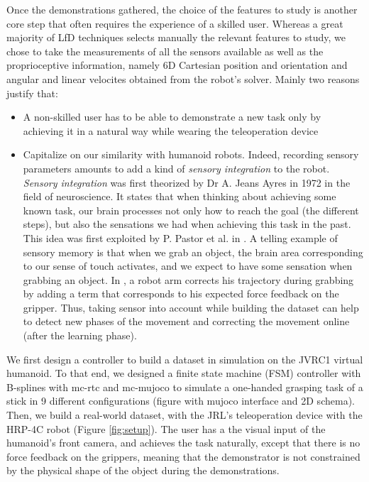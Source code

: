 \documentclass[conference]{IEEEtran}
\begin{document}
Once the demonstrations gathered, the choice of the features to study is another core step that often requires the experience of a skilled user. Whereas a great majority of LfD techniques selects manually the relevant features to study, we chose to take the measurements of all the sensors available as well as the proprioceptive information, namely 6D Cartesian position and orientation and angular and linear velocites obtained from the robot's solver. Mainly two reasons justify that:

 \begin{itemize}
     \item A non-skilled user has to be able to demonstrate a new task only by achieving it in a  natural way while wearing the teleoperation device
     \item Capitalize on our similarity with humanoid robots. Indeed, recording sensory parameters amounts to add a kind of \textit{sensory integration} to the robot. \textit{Sensory integration} was first theorized by Dr A. Jeans Ayres in 1972 in the field of neuroscience. It states that when thinking about achieving some known task, our brain processes not only how to reach the goal (the different steps), but also the sensations we had when achieving this task in the past. This idea was first exploited by P. Pastor et al. in \cite{sensory_skill}. A telling example of sensory memory is that when we grab an object, the brain area corresponding to our sense of touch activates, and we expect to have some sensation when grabbing an object. In \cite{sensory_skill}, a robot arm corrects his trajectory during grabbing by adding a term that corresponds to his expected force feedback on the gripper. Thus, taking sensor into account while building the dataset can help to detect new phases of the movement \cite{sensory_seg} and correcting the movement online (after the learning phase). \newline

\end{itemize}

 We first design a controller to build a dataset in  simulation on the JVRC1 virtual humanoid. To that end, we designed a finite state machine (FSM) controller with B-splines with mc-rtc and mc-mujoco \cite{singh2023mc} to simulate a one-handed grasping task of a stick in 9 different configurations (figure with mujoco interface and 2D schema). Then, we build a real-world dataset, with the JRL's teleoperation device  with the HRP-4C robot (Figure \ref{fig:setup}). The user has a the visual input of the humanoid's front camera, and achieves the task naturally, except that there is no force  feedback on the grippers, meaning that the demonstrator is not constrained by the physical shape of the object during the demonstrations.
 
\end{document}
